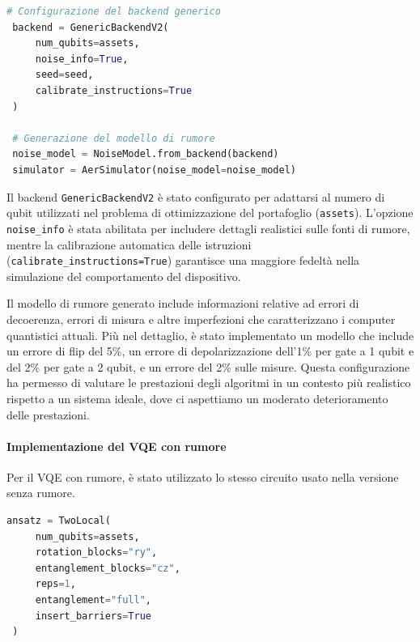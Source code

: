 \begin{lstlisting}[language=python, caption={Configurazione del modello di rumore per la simulazione.}]
 # Configurazione del backend generico
 backend = GenericBackendV2(
     num_qubits=assets, 
     noise_info=True,
     seed=seed,
     calibrate_instructions=True
 )

 # Generazione del modello di rumore
 noise_model = NoiseModel.from_backend(backend)
 simulator = AerSimulator(noise_model=noise_model)
\end{lstlisting}

Il backend \texttt{GenericBackendV2} è stato configurato per adattarsi al numero 
di qubit utilizzati nel problema di ottimizzazione del portafoglio (\texttt{assets}). 
L'opzione \texttt{noise\_info} è stata abilitata per includere dettagli realistici 
sulle fonti di rumore, mentre la calibrazione automatica delle istruzioni 
(\texttt{calibrate\_instructions=True}) garantisce una maggiore fedeltà nella 
simulazione del comportamento del dispositivo.

Il modello di rumore generato include informazioni relative ad errori di decoerenza, 
errori di misura e altre imperfezioni che caratterizzano i computer quantistici 
attuali. Più nel dettaglio, è stato implementato un modello che include un errore 
di flip del 5\%, un errore di depolarizzazione dell'1\% per gate a 1 qubit e del 2\%
per gate a 2 qubit, e un errore del 2\% sulle misure. Questa configurazione ha 
permesso di valutare le prestazioni degli algoritmi in un contesto più realistico 
rispetto a un sistema ideale, dove ci aspettiamo un moderato deterioramento delle 
prestazioni.



\paragraph{Implementazione del VQE con rumore} 

Per il VQE con rumore, è stato utilizzato lo stesso circuito usato nella versione senza rumore.

\begin{lstlisting}[language=python, caption={Configurazione dell'ansatz per il VQE.}]
 ansatz = TwoLocal(
     num_qubits=assets,
     rotation_blocks="ry",
     entanglement_blocks="cz",
     reps=1,
     entanglement="full",
     insert_barriers=True
 )
\end{lstlisting}

